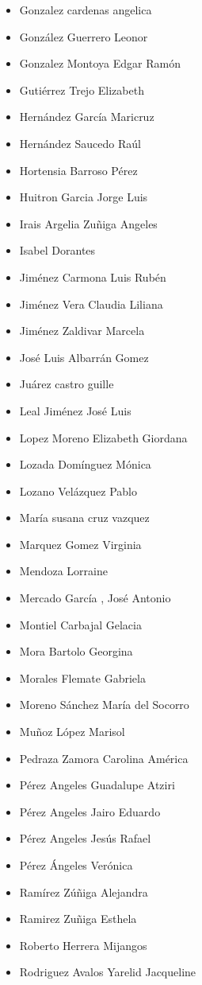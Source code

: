\begin{spacing}{0.5}
\begin{paracol}{2}
\begin{itemize}
\item Gonzalez cardenas angelica
\item González Guerrero Leonor
\item Gonzalez Montoya Edgar Ramón
\item Gutiérrez Trejo Elizabeth
\item Hernández García Maricruz
\item Hernández Saucedo Raúl
\item Hortensia Barroso Pérez
\item Huitron Garcia Jorge Luis
\item Irais Argelia Zuñiga Angeles
\item Isabel Dorantes
\item Jiménez Carmona Luis Rubén
\item Jiménez Vera Claudia Liliana
\item Jiménez Zaldivar Marcela
\item José Luis Albarrán Gomez
\item Juárez castro guille
\item Leal Jiménez José Luis
\item Lopez Moreno Elizabeth Giordana
\item Lozada Domínguez Mónica
\item Lozano Velázquez Pablo
\item María susana cruz vazquez
\item Marquez Gomez Virginia
\item Mendoza Lorraine
\item Mercado García , José Antonio
\item Montiel Carbajal Gelacia
\item Mora Bartolo Georgina
\item Morales Flemate Gabriela
\item Moreno Sánchez María del Socorro
\item Muñoz López Marisol
\item Pedraza Zamora Carolina América
\item Pérez Angeles Guadalupe Atziri
\item Pérez Angeles Jairo Eduardo
\item Pérez Angeles Jesús Rafael
\item Pérez Ángeles Verónica
\item Ramírez Zúñiga Alejandra
\item Ramirez Zuñiga Esthela
\item Roberto Herrera Mijangos
\item Rodriguez Avalos Yarelid Jacqueline

\end{itemize}
\end{paracol}
\end{spacing}
